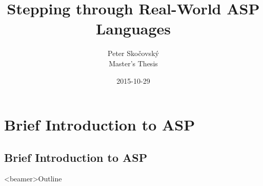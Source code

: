 \documentclass{beamer}
\title[Stepping through ASP]
{Stepping through Real-World ASP Languages}
\author[P. Skočovský]
{
	Peter Skočovský\\
	\scriptsize
	Master's Thesis
}
\date
{2015-10-29}
\begin{document}
\begin{frame}
	\titlepage
\end{frame}
% 

% 
% 	
% 	



\section{Brief Introduction to ASP}


\subsection{Brief Introduction to ASP}

\begin{frame}<beamer>{Outline}
\end{frame}
\end{document}
